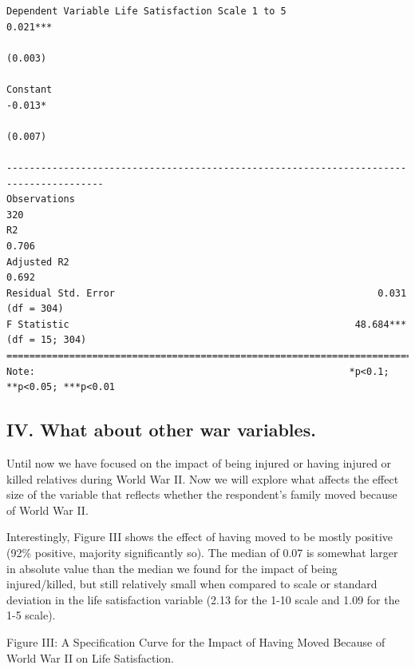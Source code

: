 \documentclass[
  letterpaper,
  DIV=11,
  numbers=noendperiod]{scrartcl}
\begin{document}
\begin{verbatim}
Dependent Variable Life Satisfaction Scale 1 to 5                    0.021***          
                                                                      (0.003)          
                                                                                       
Constant                                                              -0.013*          
                                                                      (0.007)          
                                                                                       
---------------------------------------------------------------------------------------
Observations                                                            320            
R2                                                                     0.706           
Adjusted R2                                                            0.692           
Residual Std. Error                                              0.031 (df = 304)      
F Statistic                                                  48.684*** (df = 15; 304)  
=======================================================================================
Note:                                                       *p<0.1; **p<0.05; ***p<0.01
\end{verbatim}

\hypertarget{iv.-what-about-other-war-variables.}{%
\subsection{IV. What about other war
variables.}\label{iv.-what-about-other-war-variables.}}

Until now we have focused on the impact of being injured or having
injured or killed relatives during World War II. Now we will explore
what affects the effect size of the variable that reflects whether the
respondent's family moved because of World War II.

Interestingly, Figure III shows the effect of having moved to be mostly
positive (92\% positive, majority significantly so). The median of 0.07
is somewhat larger in absolute value than the median we found for the
impact of being injured/killed, but still relatively small when compared
to scale or standard deviation in the life satisfaction variable (2.13
for the 1-10 scale and 1.09 for the 1-5 scale).

Figure III: A Specification Curve for the Impact of Having Moved Because
of World War II on Life Satisfaction.
\end{document}
